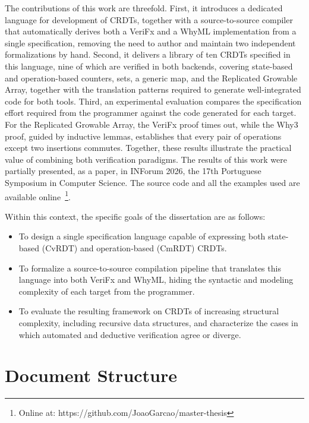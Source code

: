 The contributions of this work are threefold. First, it introduces a dedicated language for development of CRDTs,
together with a source-to-source compiler that automatically derives both a VeriFx and a WhyML implementation from a
single specification, removing the need to author and maintain two independent formalizations by hand. Second, it delivers
a library of ten CRDTs specified in this language, nine of which are verified in both backends, covering state-based and
operation-based counters, sets, a generic map, and the Replicated Growable Array, together with the translation patterns
required to generate well-integrated code for both tools. Third, an experimental evaluation compares the specification
effort required from the programmer against the code generated for each target. For the Replicated Growable Array, the
VeriFx proof times out, while the Why3 proof, guided by inductive lemmas, establishes that every pair of operations except
two insertions commutes. Together, these results illustrate the practical value of combining both verification paradigms.
The results of this work were partially presented, as a paper, in INForum 2026, the 17th Portuguese Symposium in
Computer Science. The source code and all the examples used are available online~\footnote{Online at: https://github.com/JoaoGarcao/master-thesis}.

Within this context, the specific goals of the dissertation are as follows:

\begin{itemize}
    \item To design a single specification language capable of expressing both state-based (CvRDT) and operation-based
    (CmRDT) CRDTs.
    \item To formalize a source-to-source compilation pipeline that translates this language into both VeriFx and WhyML,
    hiding the syntactic and modeling complexity of each target from the programmer.
    \item To evaluate the resulting framework on CRDTs of increasing structural complexity, including recursive data
    structures, and characterize the cases in which automated and deductive verification agree or diverge.
\end{itemize}

\section{Document Structure}
\label{sec:structure}


